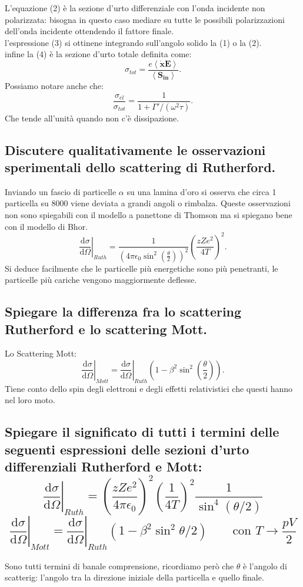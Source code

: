L'equazione (2) è la sezione d'urto differenziale con l'onda incidente non polarizzata: bisogna in questo caso mediare su tutte le possibili polarizzazioni dell'onda incidente ottendendo il fattore finale.\\
l'espressione (3) si ottinene integrando sull'angolo solido la (1) o la (2).\\
infine la (4) è la sezione d'urto totale definita come:
\[
	\sigma_{tot} = \frac{e \left< \dot{\boldsymbol{x}}\boldsymbol{E}\right>}{\left<\boldsymbol{S_{in}} \right>}
.\]
Possiamo notare anche che:
\[
	\frac{\sigma_{el}}{\sigma_{tot}} = \frac{1}{1 + \Gamma'/\left( \omega^2\tau \right)  }
.\] 
Che tende all'unità quando non c'è dissipazione.

\subsection[]{ Discutere qualitativamente le osservazioni sperimentali dello scattering di Rutherford.}
Inviando un fascio di particelle $\alpha$ su una lamina d'oro si osserva che circa 1 particella su 8000 viene deviata a grandi angoli o rimbalza. Queste osservazioni non sono spiegabili con il modello a panettone di Thomson ma si spiegano bene con il modello di Bhor.
\[
	\left. \frac{\mbox{d} \sigma}{\mbox{d} \Omega} \right|_{Ruth} = \frac{1}{\left(4\pi \epsilon_0\sin^{2}\left( \frac{\theta}{2} \right) \right)^2 } \left(\frac{zZe^2}{4T} \right)^2 
.\] 
Si deduce facilmente che le particelle più energetiche sono più penetranti, le particelle più cariche vengono maggiormente deflesse.

\subsection[]{ Spiegare la differenza fra lo scattering Rutherford e lo scattering Mott.}
Lo Scattering Mott:
\[
	\left. \frac{\mbox{d} \sigma}{\mbox{d} \Omega} \right|_{Mott} = \left. \frac{\mbox{d} \sigma}{\mbox{d} \Omega} \right|_{Ruth} \left( 1- \beta^2 \sin^2\left( \frac{\theta}{2} \right)  \right) 
.\] 
Tiene conto dello spin degli elettroni e degli effetti relativistici che questi hanno nel loro moto.

\subsection[]{ Spiegare il significato di tutti i termini delle seguenti espressioni delle sezioni d’urto differenziali Rutherford e Mott: 
\[
	\left. \frac{\mbox{d} \sigma}{\mbox{d} \Omega} \right|_{Ruth} = \left( \frac{zZe^2}{4 \pi \epsilon_0} \right)^2 \left( \frac{1}{4T} \right)^2 \frac{1}{\sin^4\left( \theta/2 \right) }  
\] 
\[
	\left. \frac{\mbox{d} \sigma}{\mbox{d} \Omega} \right|_{Mott} = \left. \frac{\mbox{d} \sigma}{\mbox{d} \Omega} \right|_{Ruth} \left( 1 - \beta^2 \sin^2 \theta/2  \right) \quad \quad
	\text{con } T \to \frac{pV}{2}
\] 
}
Sono tutti termini di banale comprensione, ricordiamo però che $\theta$ è l'angolo di scatterig: l'angolo tra la direzione iniziale della particella e quello finale.

